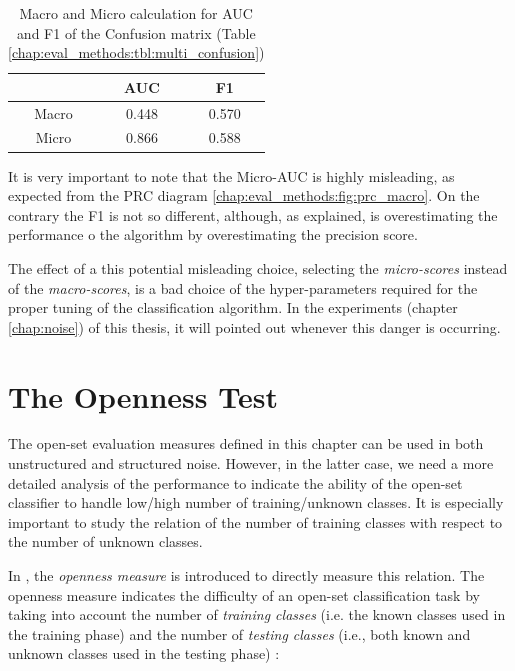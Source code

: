 \begin{table}[t]
	\center
	\caption{Macro and Micro calculation for AUC and F1 of the Confusion matrix (Table \ref{chap:eval_methods:tbl:multi_confusion})}\label{chap:eval_methods:tbl:AUC_F1}
	\begin{tabular}{c|c|c|}
		\cline{2-3}
		& AUC & F1 \\
		\hline
		\multicolumn{1}{|c|}{Macro} & 0.448 & 0.570 \\
		\multicolumn{1}{|c|}{Micro} & 0.866 & 0.588 \\	
		\hline
	\end{tabular}
\end{table}

It is very important to note that the Micro-AUC is highly misleading, as expected from the PRC diagram \ref{chap:eval_methods:fig:prc_macro}. On the contrary the F1 is not so different, although, as explained, is overestimating the performance o the algorithm by overestimating the precision score. 

The effect of a this potential misleading choice, selecting the \textit{micro-scores} instead of the \textit{macro-scores}, is a bad choice of the  hyper-parameters required for the proper tuning of the classification algorithm. In the experiments (chapter \ref{chap:noise}) of this thesis, it will pointed out whenever this danger is occurring.

\section{The Openness Test}\label{chap:eval_methods:sec:openness}

The open-set evaluation measures defined in this chapter can be used in both unstructured and structured noise. However, in the latter case, we need a more detailed analysis of the performance to indicate the ability of the open-set classifier to handle low/high number of training/unknown classes. It is especially important to study the relation of the number of training classes with respect to the number of unknown classes. 

In \parencite{scheirer2013toward}, the \textit{openness measure} is introduced to directly measure this relation. The openness measure indicates the difficulty of an open-set classification task by taking into account the number of \textit{training classes} (i.e. the known classes used in the training phase) and the number of \textit{testing classes} (i.e., both known and unknown classes used in the testing phase) :

